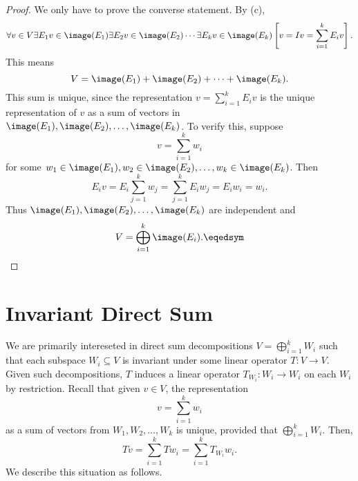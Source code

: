 \documentclass[linearalgebra]{subfiles}
\begin{document}
    \begin{proof}
        We only have to prove the converse statement. By (c),
        \begin{equation*}
            \forall v\in V\exists E_1v\in \image(E_1)\exists E_2v\in \image(E_2)\cdots\exists E_kv\in \image(E_k) \left[ v = Iv = \sum^{k}_{i=1} E_iv \right].
        \end{equation*}
        This means
        \begin{equation*}
            V = \image(E_1) + \image(E_2) + \cdots + \image(E_k).
        \end{equation*}
        This sum is unique, since the representation $v = \sum^{k}_{i=1} E_iv$ is the unique representation of $v$ as a sum of vectors in $\image(E_1), \image(E_2), \ldots, \image(E_k)$. To verify this, suppose
        \begin{equation*}
            v = \sum^{k}_{i=1} w_i
        \end{equation*}
        for some $w_1\in \image(E_1), w_2\in \image(E_2), \ldots, w_k\in \image(E_k)$. Then
        \begin{equation*}
            E_iv = E_i \sum^{k}_{j=1} w_j = \sum^{k}_{j=1} E_iw_j = E_iw_i = w_i.
        \end{equation*}
        Thus $\image(E_1), \image(E_2), \ldots, \image(E_k)$ are independent and
        \begin{equation*}
            V = \bigoplus^{k}_{i=1} \image(E_i). \eqedsym
        \end{equation*}
    \end{proof}

    \section{Invariant Direct Sum}

    \begin{remark}
        We are primarily intereseted in direct sum decompositions $V = \bigoplus^{k}_{i=1} W_i$ such that each subspace $W_i\subseteq V$ is invariant under some linear operator $T:V\to V$. Given such decompositions, $T$ induces a linear operator $T_{W_i}: W_i\to W_i$ on each $W_i$ by restriction. Recall that given $v\in V$, the representation
        \begin{equation*}
            v = \sum^{k}_{i=1} w_i
        \end{equation*}
        as a sum of vectors from $W_1, W_2, \ldots, W_k$ is unique, provided that $\bigoplus^{k}_{i=1} W_i$. Then,
        \begin{equation*}
            Tv = \sum^{k}_{i=1} Tw_i = \sum^{k}_{i=1} T_{W_i}w_i.
        \end{equation*}
        We describe this situation as follows.
    \end{remark}
\end{document}
